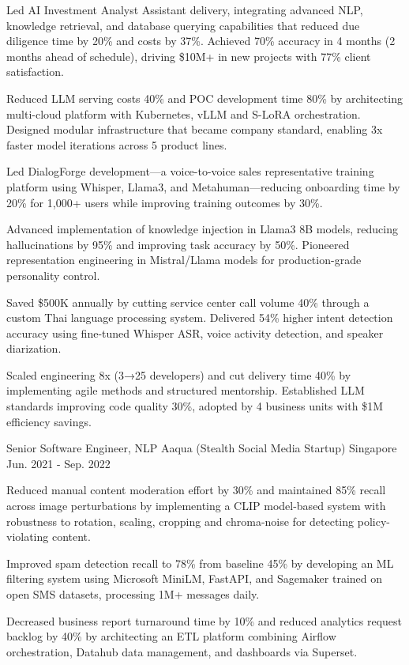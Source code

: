 \begin{cventries}
{\begin{cvitems}
        \item{Led AI Investment Analyst Assistant delivery, integrating advanced NLP, knowledge retrieval, and database querying capabilities that reduced due diligence time by 20\% and costs by 37\%. Achieved 70\% accuracy in 4 months (2 months ahead of schedule), driving \$10M+ in new projects with 77\% client satisfaction.}
        \item{Reduced LLM serving costs 40\% and POC development time 80\% by architecting multi-cloud platform with Kubernetes, vLLM and S-LoRA orchestration. Designed modular infrastructure that became company standard, enabling 3x faster model iterations across 5 product lines.}
        \item{Led DialogForge development—a voice-to-voice sales representative training platform using Whisper, Llama3, and Metahuman—reducing onboarding time by 20\% for 1,000+ users while improving training outcomes by 30\%.}
        \item{Advanced implementation of knowledge injection in Llama3 8B models, reducing hallucinations by 95\% and improving task accuracy by 50\%. Pioneered representation engineering in Mistral/Llama models for production-grade personality control.}
        \item{Saved \$500K annually by cutting service center call volume 40\% through a custom Thai language processing system. Delivered 54\% higher intent detection accuracy using fine-tuned Whisper ASR, voice activity detection, and speaker diarization.}
        \item{Scaled engineering 8x (3→25 developers) and cut delivery time 40\% by implementing agile methods and structured mentorship. Established LLM standards improving code quality 30\%, adopted by 4 business units with \$1M efficiency savings.}
      \end{cvitems}
    }

  \cventry
    {Senior Software Engineer, NLP} %
    {Aaqua (Stealth Social Media Startup)} %
    {Singapore} %
    {Jun. 2021  - Sep. 2022} %
    {
      \begin{cvitems} %
        \item {Reduced manual content moderation effort by 30\% and maintained 85\% recall across image perturbations by implementing a CLIP model-based system with robustness to rotation, scaling, cropping and chroma-noise for detecting policy-violating content.}
        \item {Improved spam detection recall to 78\% from baseline 45\% by developing an ML filtering system using Microsoft MiniLM, FastAPI, and Sagemaker trained on open SMS datasets, processing 1M+ messages daily.}
        \item {Decreased business report turnaround time by 10\% and reduced analytics request backlog by 40\% by architecting an ETL platform combining Airflow orchestration, Datahub data management, and dashboards via Superset.}
      \end{cvitems}
    }


\end{cventries}
